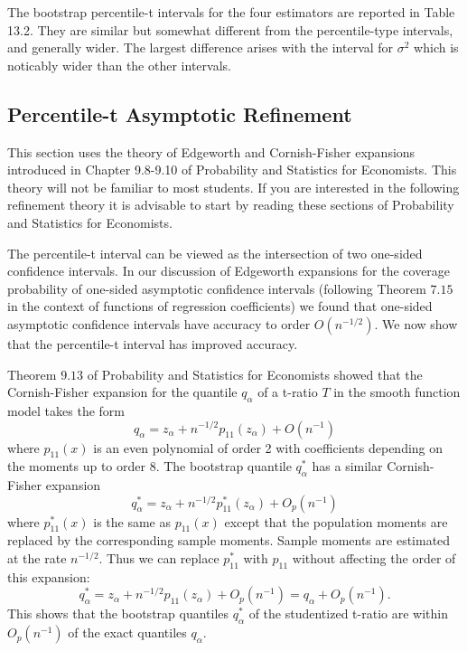 \documentclass[10pt]{article}
\begin{document}
The bootstrap percentile-t intervals for the four estimators are reported in Table 13.2. They are similar but somewhat different from the percentile-type intervals, and generally wider. The largest difference arises with the interval for $\sigma^{2}$ which is noticably wider than the other intervals.

\subsection{Percentile-t Asymptotic Refinement}
This section uses the theory of Edgeworth and Cornish-Fisher expansions introduced in Chapter 9.8-9.10 of Probability and Statistics for Economists. This theory will not be familiar to most students. If you are interested in the following refinement theory it is advisable to start by reading these sections of Probability and Statistics for Economists.

The percentile-t interval can be viewed as the intersection of two one-sided confidence intervals. In our discussion of Edgeworth expansions for the coverage probability of one-sided asymptotic confidence intervals (following Theorem $7.15$ in the context of functions of regression coefficients) we found that one-sided asymptotic confidence intervals have accuracy to order $O\left(n^{-1 / 2}\right)$. We now show that the percentile-t interval has improved accuracy.

Theorem $9.13$ of Probability and Statistics for Economists showed that the Cornish-Fisher expansion for the quantile $q_{\alpha}$ of a t-ratio $T$ in the smooth function model takes the form
$$
q_{\alpha}=z_{\alpha}+n^{-1 / 2} p_{11}\left(z_{\alpha}\right)+O\left(n^{-1}\right)
$$
where $p_{11}(x)$ is an even polynomial of order 2 with coefficients depending on the moments up to order 8. The bootstrap quantile $q_{\alpha}^{*}$ has a similar Cornish-Fisher expansion
$$
q_{\alpha}^{*}=z_{\alpha}+n^{-1 / 2} p_{11}^{*}\left(z_{\alpha}\right)+O_{p}\left(n^{-1}\right)
$$
where $p_{11}^{*}(x)$ is the same as $p_{11}(x)$ except that the population moments are replaced by the corresponding sample moments. Sample moments are estimated at the rate $n^{-1 / 2}$. Thus we can replace $p_{11}^{*}$ with $p_{11}$ without affecting the order of this expansion:
$$
q_{\alpha}^{*}=z_{\alpha}+n^{-1 / 2} p_{11}\left(z_{\alpha}\right)+O_{p}\left(n^{-1}\right)=q_{\alpha}+O_{p}\left(n^{-1}\right) .
$$
This shows that the bootstrap quantiles $q_{\alpha}^{*}$ of the studentized t-ratio are within $O_{p}\left(n^{-1}\right)$ of the exact quantiles $q_{\alpha}$.
\end{document}
